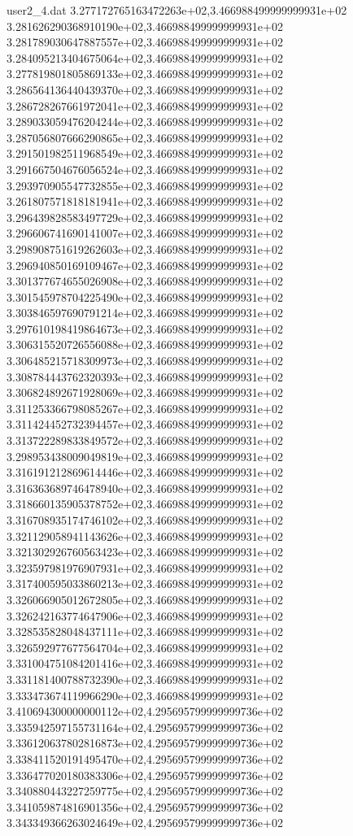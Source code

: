 \begin{filecontents}{user2_4.dat}
3.277172765163472263e+02,3.466988499999999931e+02
3.281626290368910190e+02,3.466988499999999931e+02
3.281789030647887557e+02,3.466988499999999931e+02
3.284095213404675064e+02,3.466988499999999931e+02
3.277819801805869133e+02,3.466988499999999931e+02
3.286564136440439370e+02,3.466988499999999931e+02
3.286728267661972041e+02,3.466988499999999931e+02
3.289033059476204244e+02,3.466988499999999931e+02
3.287056807666290865e+02,3.466988499999999931e+02
3.291501982511968549e+02,3.466988499999999931e+02
3.291667504676056524e+02,3.466988499999999931e+02
3.293970905547732855e+02,3.466988499999999931e+02
3.261807571818181941e+02,3.466988499999999931e+02
3.296439828583497729e+02,3.466988499999999931e+02
3.296606741690141007e+02,3.466988499999999931e+02
3.298908751619262603e+02,3.466988499999999931e+02
3.296940850169109467e+02,3.466988499999999931e+02
3.301377674655026908e+02,3.466988499999999931e+02
3.301545978704225490e+02,3.466988499999999931e+02
3.303846597690791214e+02,3.466988499999999931e+02
3.297610198419864673e+02,3.466988499999999931e+02
3.306315520726556088e+02,3.466988499999999931e+02
3.306485215718309973e+02,3.466988499999999931e+02
3.308784443762320393e+02,3.466988499999999931e+02
3.306824892671928069e+02,3.466988499999999931e+02
3.311253366798085267e+02,3.466988499999999931e+02
3.311424452732394457e+02,3.466988499999999931e+02
3.313722289833849572e+02,3.466988499999999931e+02
3.298953438009049819e+02,3.466988499999999931e+02
3.316191212869614446e+02,3.466988499999999931e+02
3.316363689746478940e+02,3.466988499999999931e+02
3.318660135905378752e+02,3.466988499999999931e+02
3.316708935174746102e+02,3.466988499999999931e+02
3.321129058941143626e+02,3.466988499999999931e+02
3.321302926760563423e+02,3.466988499999999931e+02
3.323597981976907931e+02,3.466988499999999931e+02
3.317400595033860213e+02,3.466988499999999931e+02
3.326066905012672805e+02,3.466988499999999931e+02
3.326242163774647906e+02,3.466988499999999931e+02
3.328535828048437111e+02,3.466988499999999931e+02
3.326592977677564704e+02,3.466988499999999931e+02
3.331004751084201416e+02,3.466988499999999931e+02
3.331181400788732390e+02,3.466988499999999931e+02
3.333473674119966290e+02,3.466988499999999931e+02
3.410694300000000112e+02,4.295695799999999736e+02
3.335942597155731164e+02,4.295695799999999736e+02
3.336120637802816873e+02,4.295695799999999736e+02
3.338411520191495470e+02,4.295695799999999736e+02
3.336477020180383306e+02,4.295695799999999736e+02
3.340880443227259775e+02,4.295695799999999736e+02
3.341059874816901356e+02,4.295695799999999736e+02
3.343349366263024649e+02,4.295695799999999736e+02

\end{filecontents}
